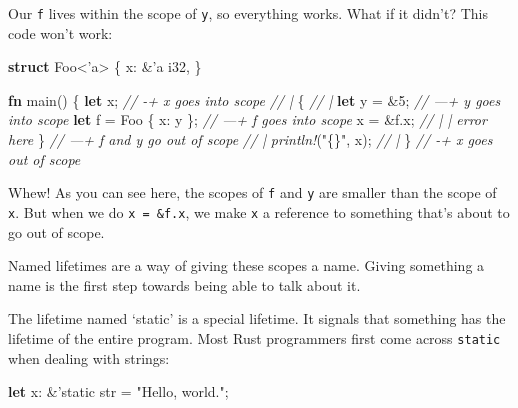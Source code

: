 \documentclass[a4paper,]{book}
\newenvironment{Shaded}{\begin{snugshade}}{\end{snugshade}}
\newcommand{\KeywordTok}[1]{\textcolor[rgb]{0.13,0.29,0.53}{\textbf{{#1}}}}
\newcommand{\DataTypeTok}[1]{\textcolor[rgb]{0.13,0.29,0.53}{{#1}}}
\newcommand{\DecValTok}[1]{\textcolor[rgb]{0.00,0.00,0.81}{{#1}}}
\newcommand{\StringTok}[1]{\textcolor[rgb]{0.31,0.60,0.02}{{#1}}}
\newcommand{\CommentTok}[1]{\textcolor[rgb]{0.56,0.35,0.01}{\textit{{#1}}}}
\newcommand{\OtherTok}[1]{\textcolor[rgb]{0.56,0.35,0.01}{{#1}}}
\newcommand{\PreprocessorTok}[1]{\textcolor[rgb]{0.56,0.35,0.01}{\textit{{#1}}}}
\newcommand{\NormalTok}[1]{{#1}}
\begin{document}
Our \texttt{f} lives within the scope of \texttt{y}, so everything
works. What if it didn't? This code won't work:

\begin{Shaded}
\begin{Highlighting}[]
\KeywordTok{struct} \NormalTok{Foo<}\OtherTok{'a}\NormalTok{> \{}
    \NormalTok{x: &}\OtherTok{'a} \DataTypeTok{i32}\NormalTok{,}
\NormalTok{\}}

\KeywordTok{fn} \NormalTok{main() \{}
    \KeywordTok{let} \NormalTok{x;                    }\CommentTok{// -+ x goes into scope}
                              \CommentTok{//  |}
    \NormalTok{\{                         }\CommentTok{//  |}
        \KeywordTok{let} \NormalTok{y = &}\DecValTok{5}\NormalTok{;           }\CommentTok{// ---+ y goes into scope}
        \KeywordTok{let} \NormalTok{f = Foo \{ x: y \}; }\CommentTok{// ---+ f goes into scope}
        \NormalTok{x = &f.x;             }\CommentTok{//  | | error here}
    \NormalTok{\}                         }\CommentTok{// ---+ f and y go out of scope}
                              \CommentTok{//  |}
    \PreprocessorTok{println!}\NormalTok{(}\StringTok{"\{\}"}\NormalTok{, x);        }\CommentTok{//  |}
\NormalTok{\}                             }\CommentTok{// -+ x goes out of scope}
\end{Highlighting}
\end{Shaded}

Whew! As you can see here, the scopes of \texttt{f} and \texttt{y} are
smaller than the scope of \texttt{x}. But when we do
\texttt{x\ =\ \&f.x}, we make \texttt{x} a reference to something that's
about to go out of scope.

Named lifetimes are a way of giving these scopes a name. Giving
something a name is the first step towards being able to talk about it.


The lifetime named `static' is a special lifetime. It signals that
something has the lifetime of the entire program. Most Rust programmers
first come across \texttt{\textquotesingle{}static} when dealing with
strings:

\begin{Shaded}
\begin{Highlighting}[]
\KeywordTok{let} \NormalTok{x: &}\OtherTok{'static} \DataTypeTok{str} \NormalTok{= }\StringTok{"Hello, world."}\NormalTok{;}
\end{Highlighting}
\end{Shaded}
\end{document}

